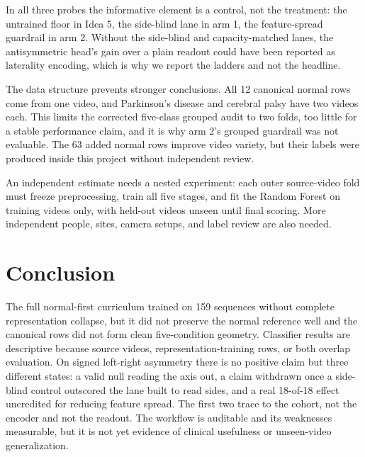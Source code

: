 \documentclass[conference]{IEEEtran}
\begin{document}
In all three probes the informative element is a control, not the treatment: the untrained floor in Idea 5, the side-blind lane in arm 1, the feature-spread guardrail in arm 2. Without the side-blind and capacity-matched lanes, the antisymmetric head's gain over a plain readout could have been reported as laterality encoding, which is why we report the ladders and not the headline.

The data structure prevents stronger conclusions. All 12 canonical normal rows come from one video, and Parkinson's disease and cerebral palsy have two videos each. This limits the corrected five-class grouped audit to two folds, too little for a stable performance claim, and it is why arm 2's grouped guardrail was not evaluable. The 63 added normal rows improve video variety, but their labels were produced inside this project without independent review.

An independent estimate needs a nested experiment: each outer source-video fold must freeze preprocessing, train all five stages, and fit the Random Forest on training videos only, with held-out videos unseen until final scoring. More independent people, sites, camera setups, and label review are also needed.

\section{Conclusion}
The full normal-first curriculum trained on 159 sequences without complete representation collapse, but it did not preserve the normal reference well and the canonical rows did not form clean five-condition geometry. Classifier results are descriptive because source videos, representation-training rows, or both overlap evaluation. On signed left-right asymmetry there is no positive claim but three different states: a valid null reading the axis out, a claim withdrawn once a side-blind control outscored the lane built to read sides, and a real 18-of-18 effect uncredited for reducing feature spread. The first two trace to the cohort, not the encoder and not the readout. The workflow is auditable and its weaknesses measurable, but it is not yet evidence of clinical usefulness or unseen-video generalization.



\end{document}
